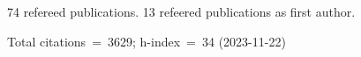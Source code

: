 74 refereed publications. 13 refeered publications as first author.

Total citations~=~3629; h-index~=~34 (2023-11-22)